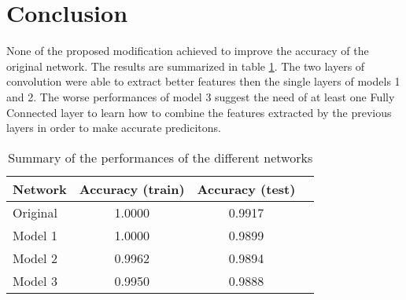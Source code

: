 \section{Conclusion}
\label{sec:conclusion}

None of the proposed modification achieved to improve the accuracy of the original network.
The results are summarized in table \cref{tab:summary}.
The two layers of convolution were able to extract better features then the single layers of models 1 and 2.
The worse performances of model 3 suggest the need of at least one Fully Connected layer to learn how to combine the features extracted by the previous layers in order to make accurate predicitons.

\begin{table}
	\centering
	\caption{Summary of the performances of the different networks}
	\label{tab:summary}
	\begin{tabular}{lccc}
		\toprule
			\multicolumn{1}{l}{Network} &
			\multicolumn{1}{c}{Accuracy (train)} &
			\multicolumn{1}{c}{Accuracy (test)} \\
		\midrule
			Original & 1.0000 & 0.9917 \\
			Model 1  & 1.0000 & 0.9899 \\
			Model 2  & 0.9962 & 0.9894 \\
			Model 3  & 0.9950 & 0.9888 \\
		\bottomrule
	\end{tabular}
\end{table}
